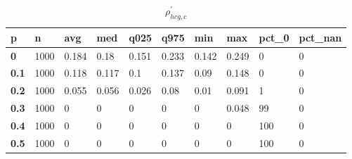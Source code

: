 \begin{table}[h]
 \centering 
\footnotesize
\caption{$\rho_{hcg,c}^\prime $}
\label{tab:alphahcgc}
\begin{tabular}[h]{|l|l|l|l|l|l|l|l|l|l|
    } \hline
\textbf{ p} & \textbf{ n} & \textbf{ avg} & \textbf{ med} & \textbf{ q025} & \textbf{ q975} & \textbf{ min} & \textbf{ max} & \textbf{ pct\_0} & \textbf{ pct\_nan}
    \\ \hline
  \textbf{  0} & 1000 & 0.184 &  0.18 & 0.151 & 0.233 & 0.142 & 0.249 &   0 & 0
    \\ \hline
  \textbf{0.1} & 1000 & 0.118 & 0.117 &   0.1 & 0.137 &  0.09 & 0.148 &   0 & 0
    \\ \hline
  \textbf{0.2} & 1000 & 0.055 & 0.056 & 0.026 &  0.08 &  0.01 & 0.091 &   1 & 0
    \\ \hline
  \textbf{0.3} & 1000 &     0 &     0 &     0 &     0 &     0 & 0.048 &  99 & 0
    \\ \hline
  \textbf{0.4} & 1000 &     0 &     0 &     0 &     0 &     0 &     0 & 100 & 0
    \\ \hline
  \textbf{0.5} & 1000 &     0 &     0 &     0 &     0 &     0 &     0 & 100 & 0
    \\ \hline
 \end{tabular}
 \end{table}
